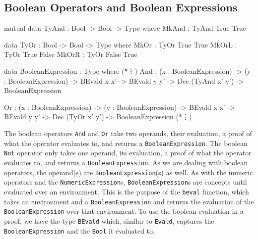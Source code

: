     \subsection{Boolean Operators and Boolean Expressions}
        \begin{code}[caption={The definitions of \texttt{And} and \texttt{Or}},escapeinside={(*}{*)}]
        mutual
            data TyAnd : Bool -> Bool -> Type where
                MkAnd  : TyAnd True True
                
            data TyOr : Bool -> Bool -> Type where
                MkOr  : TyOr True True
                MkOrL : TyOr True False
                MkOrR : TyOr False True
                
            data BooleanExpression : Type where
                (*\vdots*)
                And  : (x : BooleanExpression)
                    -> (y : BooleanExpression)
                    -> BEvald x x'
                    -> BEvald y y'
                    -> Dec (TyAnd x' y')
                    -> BooleanExpression
                    
                Or   : (x : BooleanExpression)
                    -> (y : BooleanExpression)
                    -> BEvald x x'
                    -> BEvald y y'
                    -> Dec (TyOr x' y')
                    -> BooleanExpression
                (*\vdots*)
        \end{code}
        The boolean operators \texttt{And} and \texttt{Or} take two operands, their evaluation, a proof of what the operator evaluates to, and returns a \texttt{BooleanExpression}. The boolean \texttt{Not} operator only takes one operand, its evaluation, a proof of what the operator evaluates to, and returns a \texttt{BooleanExpression}. As we are dealing with boolean operators, the operand(s) are \texttt{BooleanExpression}(s) as well.
        As with the numeric operators and the \texttt{NumericExpression}s, \texttt{BooleanExpression}s are concepts until evaluated over an environment. This is the purpose of the \texttt{beval} function, which takes an environment and a \texttt{BooleanExpression} and returns the evaluation of the \texttt{BooleanExpression} over that environment. To use the boolean evaluation in a proof, we have the type \texttt{BEvald} which, similar to \texttt{Evald}, captures the \texttt{BooleanExpression} and the \texttt{Bool} it evaluated to.
        \\\par
        

